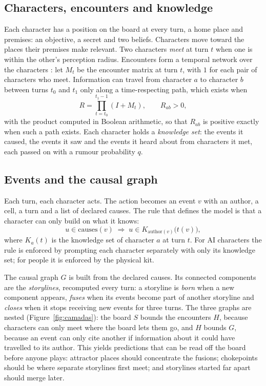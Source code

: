 \documentclass[12pt]{article}
\begin{document}
\subsection{Characters, encounters and knowledge}

Each character has a position on the board at every turn, a home place and
premises: an objective, a secret and two beliefs. Characters move toward
the places their premises make relevant. Two characters \emph{meet} at turn
$t$ when one is within the other's perception radius. Encounters form a
temporal network over the characters \parencite{holme2012}: let $M_t$ be the
encounter matrix at turn $t$, with $1$ for each pair of characters who meet.
Information can travel from character $a$ to character $b$ between turns
$t_0$ and $t_1$ only along a time-respecting path, which exists when
\begin{equation}
  R = \prod_{t=t_0}^{t_1-1}(I + M_t), \qquad R_{ab} > 0,
\end{equation}
with the product computed in Boolean arithmetic, so that $R_{ab}$ is
positive exactly when such a path exists. Each character holds a
\emph{knowledge set}: the events it caused, the events it saw and the events
it heard about from characters it met, each passed on with a rumour
probability $q$.

\subsection{Events and the causal graph}

Each turn, each character acts. The action becomes an event $v$ with an
author, a cell, a turn and a list of declared causes. The rule that defines
the model is that a character can only build on what it knows:
\begin{equation}
  u \in \mathrm{causes}(v) \;\Rightarrow\; u \in K_{\mathrm{author}(v)}\bigl(t(v)\bigr),
\end{equation}
where $K_a(t)$ is the knowledge set of character $a$ at turn $t$. For AI
characters the rule is enforced by prompting each character separately with
only its knowledge set; for people it is enforced by the physical kit.

The causal graph $G$ is built from the declared causes. Its connected
components are the \emph{storylines}, recomputed every turn: a storyline is
\emph{born} when a new component appears, \emph{fuses} when its events become
part of another storyline and \emph{closes} when it stops receiving new
events for three turns. The three graphs are nested
(Figure~\ref{fig:camadas}): the board $S$ bounds the encounters $H$, because
characters can only meet where the board lets them go, and $H$ bounds $G$,
because an event can only cite another if information about it could have
travelled to its author. This yields predictions that can be read off the
board before anyone plays: attractor places should concentrate the fusions;
chokepoints should be where separate storylines first meet; and storylines
started far apart should merge later.
\end{document}
